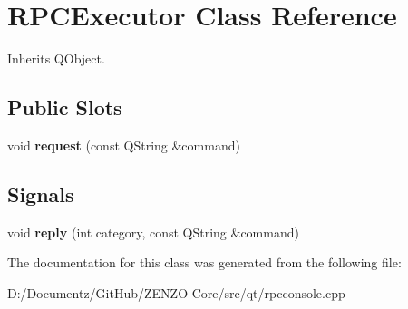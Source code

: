 \hypertarget{class_r_p_c_executor}{}\section{R\+P\+C\+Executor Class Reference}
\label{class_r_p_c_executor}


Inherits Q\+Object.

\subsection*{Public Slots}
\begin{DoxyCompactItemize}
\item 
\mbox{\label{class_r_p_c_executor_a26e314b5c74eef7a5d310578e1cdb1eb}} 
void {\bfseries request} (const Q\+String \&command)
\end{DoxyCompactItemize}
\subsection*{Signals}
\begin{DoxyCompactItemize}
\item 
\mbox{\label{class_r_p_c_executor_a1ecf85a67c8bb88cc0742b36156a3bae}} 
void {\bfseries reply} (int category, const Q\+String \&command)
\end{DoxyCompactItemize}


The documentation for this class was generated from the following file\+:\begin{DoxyCompactItemize}
\item 
D\+:/\+Documentz/\+Git\+Hub/\+Z\+E\+N\+Z\+O-\/\+Core/src/qt/rpcconsole.\+cpp\end{DoxyCompactItemize}

